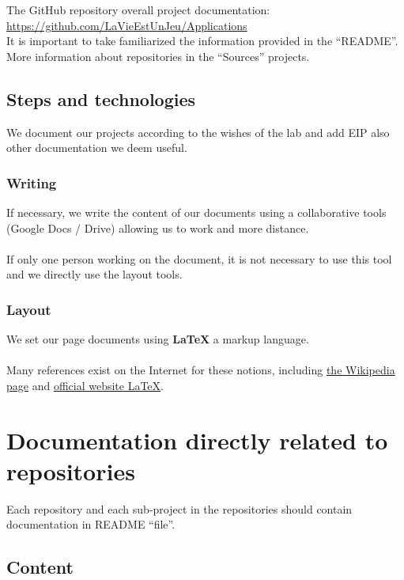 \documentclass{life-fr}
\begin{document}
The GitHub repository overall project documentation:
\url{https://github.com/LaVieEstUnJeu/Applications} \\
It is important to take familiarized the information provided in the
``README''.\\
More information about repositories in the ``Sources'' projects.

\subsection{Steps and technologies}

We document our projects according to the wishes of the lab and add EIP
also other documentation we deem useful.

\subsubsection{Writing}

If necessary, we write the content of our documents using a
collaborative tools (Google Docs / Drive) allowing us to
work and more distance.\\
\\
If only one person working on the document, it is not
necessary to use this tool and we directly use the
layout tools.

\subsubsection{Layout}

We set our page documents using \textbf{LaTeX}
a markup language.\\
\\
Many references exist on the Internet for these notions, including
\href{http://fr.wikipedia.org/wiki/Langage_de_balisage}{the Wikipedia page} and
\href{http://www.latex-project.org/}{official website LaTeX}.

\section{Documentation directly related to repositories}

Each repository and each sub-project in the repositories should contain
documentation in README ``file''.

\subsection{Content}
\end{document}
